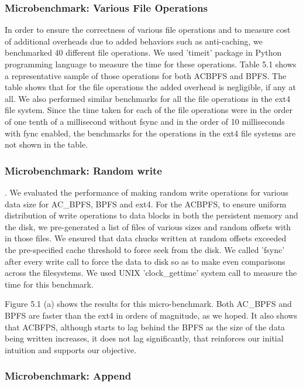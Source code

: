 \subsubsection{Microbenchmark: Various File Operations}
In order to ensure the correctness of various file operations and to measure cost of additional overheads due to added behaviors such as anti-caching, we benchmarked 40 different file operations. We used 'timeit' package in Python programming language to measure the time for these operations. Table 5.1 shows a representative sample of those operations for both AC\-BPFS and BPFS. The table shows that for the file operations the added overhead is negligible, if any at all. We also performed similar benchmarks for all the file operations in the ext4 file system. Since the time taken for each of the file operations were in the order of one tenth of a millisecond without fsync and in the order of 10 milliseconds with fync enabled, the benchmarks for the operations in the ext4 file systems are not shown in the table.

\subsubsection{Microbenchmark: Random write}
. We evaluated the performance of making random write operations for various data size for AC\_BPFS, BPFS and ext4. For the AC\-BPFS, to ensure uniform distribution of write operations to data blocks in both the persistent memory and the disk, we pre-generated a list of files of various sizes and random offsets with in those files. We ensured that data chucks written at random offsets exceeded the pre-specified cache threshold to force seek from the disk. We called 'fsync' after every write call to force the data to disk so as to make even comparisons across the filesystems. We used UNIX 'clock\_gettime' system call to measure the time for this benchmark.

Figure 5.1 (a) shows the results for this micro-benchmark. Both AC\_BPFS and BPFS are faster than the ext4 in orders of magnitude, as we hoped. It also shows that AC\-BFPS, although starts to lag behind the BPFS as the size of the data being written increases, it does not lag significantly, that reinforces our initial intuition and supports our objective.



\subsubsection{Microbenchmark: Append}

